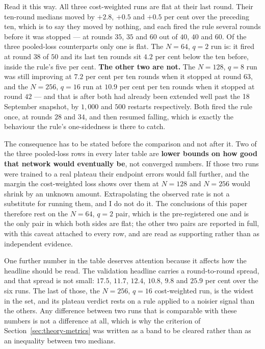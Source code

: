 \documentclass[11pt,a4paper]{article}
\begin{document}
Read it this way. All three cost-weighted runs are flat at their last round.
Their ten-round medians moved by $+2.8$, $+0.5$ and $+0.5$ per cent over the
preceding ten, which is to say they moved by nothing, and each fired the rule
several rounds before it was stopped --- at rounds $35$, $35$ and $60$ out of
$40$, $40$ and $60$. Of the three pooled-loss counterparts only one is flat.
The $N = 64$, $q = 2$ run is: it fired at round $38$ of $50$ and its last ten
rounds sit $4.2$ per cent below the ten before, inside the rule's five per cent.
\textbf{The other two are not.} The $N = 128$, $q = 8$ run was still improving
at $7.2$ per cent per ten rounds when it stopped at round $63$, and the
$N = 256$, $q = 16$ run at $10.9$ per cent per ten rounds when it stopped at
round $42$ --- and that is after both had already been extended well past the
18 September snapshot, by $1{,}000$ and $500$ restarts respectively. Both fired
the rule once, at rounds $28$ and $34$, and then resumed falling, which is
exactly the behaviour the rule's one-sidedness is there to catch.

The consequence has to be stated before the comparison and not after it. Two of
the three pooled-loss rows in every later table are \textbf{lower bounds on how
good that network would eventually be}, not converged numbers. If those two runs
were trained to a real plateau their endpoint errors would fall further, and the
margin the cost-weighted loss shows over them at $N = 128$ and $N = 256$ would
shrink by an unknown amount. Extrapolating the observed rate is not a
substitute for running them, and I do not do it. The conclusions of this paper
therefore rest on the $N = 64$, $q = 2$ pair, which is the pre-registered one
and is the only pair in which both sides are flat; the other two pairs are
reported in full, with this caveat attached to every row, and are read as
supporting rather than as independent evidence.

One further number in the table deserves attention because it affects how the
headline should be read. The validation headline carries a round-to-round
spread, and that spread is not small: $17.5$, $11.7$, $12.4$, $10.8$, $9.8$ and
$25.9$ per cent over the six runs. The last of those, the $N = 256$, $q = 16$
cost-weighted run, is the widest in the set, and its plateau verdict rests on a
rule applied to a noisier signal than the others. Any difference between two
runs that is comparable with these numbers is not a difference at all, which is
why the criterion of Section~\ref{sec:theory-metrics} was written as a band to
be cleared rather than as an inequality between two medians.
\end{document}
